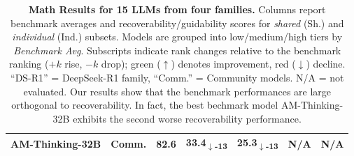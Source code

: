 \documentclass{article} %
\begin{document}
\begin{table}[t]
\begin{tabular}{r|c|c|cc|cc}
    AM-Thinking-32B      & Comm. & 82.6 & \cellcolor{red!33}33.4\textsubscript{$\downarrow$-13} & \cellcolor{red!33}25.3\textsubscript{$\downarrow$-13} & N/A & N/A \\
    \bottomrule
  \end{tabular}
  \caption{\textbf{Math Results for 15 LLMs from four families.} Columns report benchmark averages and recoverability/guidability scores for \emph{shared} (Sh.) and \emph{individual} (Ind.) subsets. Models are grouped into low/medium/high tiers by \textit{Benchmark Avg}. Subscripts indicate rank changes relative to the benchmark ranking ($+k$ rise, $-k$ drop); green ($\uparrow$) denotes improvement, red ($\downarrow$) decline. ``DS-R1'' = DeepSeek-R1 family, ``Comm.'' = Community models. N/A = not evaluated. Our results show that the benchmark performances are large orthogonal to recoverability. In fact, the best bechmark model AM-Thinking-32B exhibits the second worse recoverability performance.}
  \label{tab:combined_math_results}
\end{table}
\end{document}
